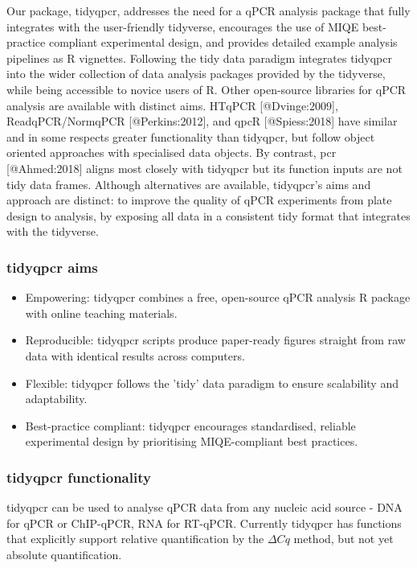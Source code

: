 \documentclass{SBCbookchapter}
\begin{document}
Our package, tidyqpcr, addresses the need for a qPCR analysis package that fully integrates with the user-friendly tidyverse, encourages the use of MIQE best-practice compliant experimental design, and provides detailed example analysis pipelines as R vignettes. Following the tidy data paradigm integrates tidyqpcr into the wider collection of data analysis packages provided by the tidyverse, while being accessible to novice users of R. Other open-source libraries for qPCR analysis are available with distinct aims. HTqPCR [@Dvinge:2009], ReadqPCR/NormqPCR [@Perkins:2012], and qpcR [@Spiess:2018] have similar and in some respects greater functionality than tidyqpcr, but follow object oriented approaches with specialised data objects. By contrast, pcr [@Ahmed:2018] aligns most closely with tidyqpcr but its function inputs are not tidy data frames. Although alternatives are available, tidyqpcr's aims and approach are distinct: to improve the quality of qPCR experiments from plate design to analysis, by exposing all data in a consistent tidy format that integrates with the tidyverse.

\subsubsection{tidyqpcr aims}

\begin{itemize}
    \item Empowering: tidyqpcr combines a free, open-source qPCR analysis R package with online teaching materials.
    \item Reproducible: tidyqpcr scripts produce paper-ready figures straight from raw data with identical results across computers.
    \item Flexible: tidyqpcr follows the 'tidy' data paradigm to ensure scalability and adaptability.
    \item Best-practice compliant: tidyqpcr encourages standardised, reliable experimental design by prioritising MIQE-compliant best practices.
\end{itemize}

\subsubsection{tidyqpcr functionality}

tidyqpcr can be used to analyse qPCR data from any nucleic acid source - DNA for qPCR or ChIP-qPCR, RNA for RT-qPCR. Currently tidyqpcr has functions that explicitly support relative quantification by the $\Delta Cq$ method, but not yet absolute quantification.
\end{document}
